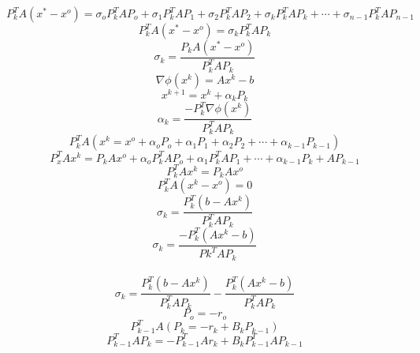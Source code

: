 \begin{displaymath}
P_k^TA(x^*-x^o)=\sigma_oP_k^TAP_o+\sigma_1P_k^TAP_1+\sigma_2P_k^TAP_2+\sigma_kP_k^TAP_k+\cdots+\sigma_{n-1}P_k^TAP_{n-1}
\end{displaymath}
\begin{displaymath}
P_k^TA(x^*-x^o)=\sigma_kP_k^TAP_k
\end{displaymath}
\begin{displaymath}
\boxed{\sigma_k=\frac{P_kA(x^*-x^o)}{P_k^TAP_k}}
\end{displaymath}
\begin{displaymath}
\nabla\phi(x^k)=Ax^k-b
\end{displaymath}
\begin{displaymath}
x^{k+1}=x^k+\alpha_kP_k
\end{displaymath}
\begin{displaymath}
\alpha_k=\frac{-P_k^T\nabla\phi(x^k)}{P_k^TAP_k}
\end{displaymath}
\begin{displaymath}
P_k^TA(x^k=x^o+\alpha_oP_o+\alpha_1P_1+\alpha_2P_2+\cdots+\alpha_{k-1}P_{k-1})
\end{displaymath}
\begin{displaymath}
P_x^TAx^k=P_kAx^o+\alpha_oP_k^TAP_o+\alpha_1P_k^TAP_1+\cdots+\alpha_{k-1}P_k+AP_{k-1}
\end{displaymath}
\begin{displaymath}
P_k^TAx^k=P_kAx^o
\end{displaymath}
\begin{displaymath}
P_k^TA(x^k-x^o)=0
\end{displaymath}
\begin{displaymath}
\sigma_k=\frac{P_k^T(b-Ax^k)}{P_k^TAP_k}
\end{displaymath}
\begin{displaymath}
\sigma_k=\frac{-P_k^T(Ax^k-b)}{Pk^TAP_k}
\end{displaymath}
\\
\begin{displaymath}
\sigma_k=\frac{P_k^T(b-Ax^k)}{P_k^TAP_k}-\frac{P_k^T(Ax^k-b)}{P_k^TAP_k}
\end{displaymath}
\begin{displaymath}
P_o=-r_o
\end{displaymath}
\begin{displaymath}
P_{k-1}^TA(P_k=-r_k+B_kP_{k-1})
\end{displaymath}
\begin{displaymath}
P_{k-1}^TAP_k=-P_{k-1}^TAr_k+B_kP_{k-1}^TAP_{k-1}
\end{displaymath}
